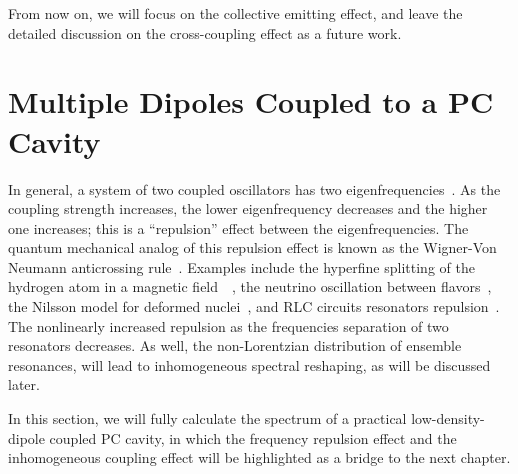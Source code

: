 From now on, we will focus on the collective emitting effect, and leave the detailed discussion on the cross-coupling effect as a future work.

\section{Multiple Dipoles Coupled to a PC Cavity}\label{PCcase}
In general, a system of two coupled oscillators has two eigenfrequencies~\cite{Goldstein2002}. As the coupling strength increases, the lower eigenfrequency decreases and the higher one increases; this is a ``repulsion'' effect between the eigenfrequencies. The quantum mechanical analog of this repulsion effect is known as the Wigner-Von Neumann anticrossing rule~\cite{Neumann1929,R.P.Feynman1970, C.Cohen-Tannoudji1977, Frank1994}. Examples include the hyperfine splitting of the hydrogen atom in a magnetic field~~\cite{R.P.Feynman1970}, the neutrino oscillation between flavors~\cite{Sassaroli1999}, the Nilsson model for deformed nuclei~\cite{Ring2004}, and RLC circuits resonators repulsion~\cite{Gamarra2007}. The nonlinearly increased repulsion as the frequencies separation of two resonators decreases. As well, the non-Lorentzian distribution of ensemble resonances, will lead to inhomogeneous spectral reshaping, as will be discussed later.

In this section, we will fully calculate the spectrum of a practical low-density-dipole coupled PC cavity,
in which the frequency repulsion effect and the inhomogeneous coupling effect will be highlighted as a bridge to the next chapter.


